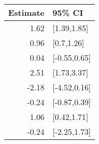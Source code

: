 \begin{tabular}{rl}
  \hline
Estimate & 95\% CI \\ 
  \hline
1.62 & [1.39,1.85] \\ 
  0.96 & [0.7,1.26] \\ 
  0.04 & [-0.55,0.65] \\ 
  2.51 & [1.73,3.37] \\ 
  -2.18 & [-4.52,0.16] \\ 
  -0.24 & [-0.87,0.39] \\ 
  1.06 & [0.42,1.71] \\ 
  -0.24 & [-2.25,1.73] \\ 
   \hline
\end{tabular}

